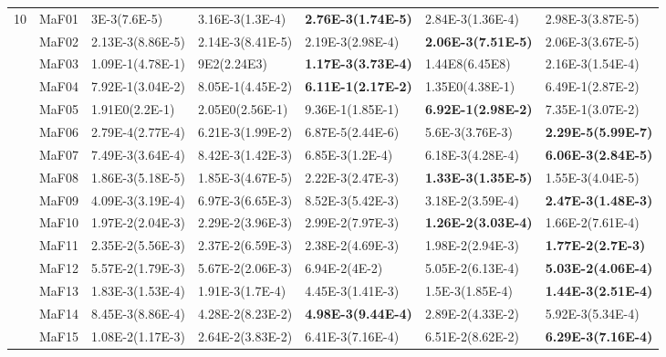 \documentclass[]{article}
\begin{document}
\begin{landscape}
\begin{table}
\begin{footnotesize}
\begin{tabular}{|l|l|l|l|l|l|l|}
\multirow{15}{*}{10} & MaF01 & 3E-3(7.6E-5) & 3.16E-3(1.3E-4) & \cellcolor{gray95} {\bf 2.76E-3(1.74E-5)} & \cellcolor{gray95} 2.84E-3(1.36E-4) & 2.98E-3(3.87E-5)\\
 & MaF02 & \cellcolor{gray95} 2.13E-3(8.86E-5) & 2.14E-3(8.41E-5) & 2.19E-3(2.98E-4) & \cellcolor{gray95} {\bf 2.06E-3(7.51E-5)} & \cellcolor{gray95} 2.06E-3(3.67E-5)\\
 & MaF03 & \cellcolor{gray95} 1.09E-1(4.78E-1) & 9E2(2.24E3) & \cellcolor{gray95} {\bf 1.17E-3(3.73E-4)} & 1.44E8(6.45E8) & 2.16E-3(1.54E-4)\\
 & MaF04 & 7.92E-1(3.04E-2) & 8.05E-1(4.45E-2) & \cellcolor{gray95} {\bf 6.11E-1(2.17E-2)} & 1.35E0(4.38E-1) & \cellcolor{gray95} 6.49E-1(2.87E-2)\\
 & MaF05 & 1.91E0(2.2E-1) & 2.05E0(2.56E-1) & 9.36E-1(1.85E-1) & \cellcolor{gray95} {\bf 6.92E-1(2.98E-2)} & \cellcolor{gray95} 7.35E-1(3.07E-2)\\
 & MaF06 & 2.79E-4(2.77E-4) & 6.21E-3(1.99E-2) & 6.87E-5(2.44E-6) & 5.6E-3(3.76E-3) & \cellcolor{gray95} {\bf 2.29E-5(5.99E-7)}\\
 & MaF07 & 7.49E-3(3.64E-4) & 8.42E-3(1.42E-3) & 6.85E-3(1.2E-4) & \cellcolor{gray95} 6.18E-3(4.28E-4) & \cellcolor{gray95} {\bf 6.06E-3(2.84E-5)}\\
 & MaF08 & 1.86E-3(5.18E-5) & 1.85E-3(4.67E-5) & 2.22E-3(2.47E-3) & \cellcolor{gray95} {\bf 1.33E-3(1.35E-5)} & \cellcolor{gray95} 1.55E-3(4.04E-5)\\
 & MaF09 & \cellcolor{gray95} 4.09E-3(3.19E-4) & 6.97E-3(6.65E-3) & 8.52E-3(5.42E-3) & 3.18E-2(3.59E-4) & \cellcolor{gray95} {\bf 2.47E-3(1.48E-3)}\\
 & MaF10 & 1.97E-2(2.04E-3) & 2.29E-2(3.96E-3) & 2.99E-2(7.97E-3) & \cellcolor{gray95} {\bf 1.26E-2(3.03E-4)} & \cellcolor{gray95} 1.66E-2(7.61E-4)\\
 & MaF11 & 2.35E-2(5.56E-3) & 2.37E-2(6.59E-3) & 2.38E-2(4.69E-3) & \cellcolor{gray95} 1.98E-2(2.94E-3) & \cellcolor{gray95} {\bf 1.77E-2(2.7E-3)}\\
 & MaF12 & 5.57E-2(1.79E-3) & 5.67E-2(2.06E-3) & 6.94E-2(4E-2) & \cellcolor{gray95} 5.05E-2(6.13E-4) & \cellcolor{gray95} {\bf 5.03E-2(4.06E-4)}\\
 & MaF13 & 1.83E-3(1.53E-4) & 1.91E-3(1.7E-4) & 4.45E-3(1.41E-3) & \cellcolor{gray95} 1.5E-3(1.85E-4) & \cellcolor{gray95} {\bf 1.44E-3(2.51E-4)}\\
 & MaF14 & 8.45E-3(8.86E-4) & 4.28E-2(8.23E-2) & \cellcolor{gray95} {\bf 4.98E-3(9.44E-4)} & 2.89E-2(4.33E-2) & \cellcolor{gray95} 5.92E-3(5.34E-4)\\
 & MaF15 & 1.08E-2(1.17E-3) & 2.64E-2(3.83E-2) & \cellcolor{gray95} 6.41E-3(7.16E-4) & 6.51E-2(8.62E-2) & \cellcolor{gray95} {\bf 6.29E-3(7.16E-4)}\\
\hline


\end{tabular}
\end{footnotesize}
\end{table}
\end{landscape}
\end{document}
